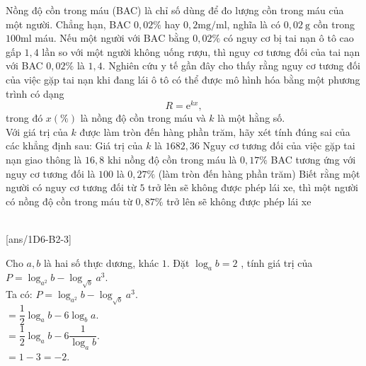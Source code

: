 \begin{ex}%
	Nồng độ cồn trong máu (BAC) là chỉ số dùng để đo lượng cồn trong máu của một người. Chẳng hạn, BAC $0{,}02\%$ hay $0{,}2 \mathrm{mg} / \mathrm{ml}$, nghĩa là có $0{,}02 \mathrm{~g}$ cồn trong $100 \mathrm{ml}$ máu. Nếu một người với $\mathrm{BAC}$ bằng $0{,}02 \%$ có nguy cơ bị tai nạn ô tô cao gấp $1{,}4$ lần so với một người không uống rượu, thì nguy cơ tương đối của tai nạn với BAC $0{,}02 \%$ là $1{,}4$. Nghiên cứu y tế gần đây cho thấy rằng nguy cơ tương đối của việc gặp tai nạn khi đang lái ô tô có thể được mô hình hóa bằng một phương trình có dạng
	$$R=\mathrm{e}^{kx},$$
	trong đó $x(\%)$ là nồng độ cồn trong máu và $k$ là một hằng số.\\
	Với giá trị của $k$ được làm tròn đến hàng phần trăm, hãy xét tính đúng sai của các khẳng định sau:
	\choiceTF
	{\True Giá trị của $k$ là $1682,36$}
	{Nguy cơ tương đối của việc gặp tai nạn giao thông là $16,8$ khi nồng độ cồn trong máu là $0{,}17\%$ }
	{\True BAC tương ứng với  nguy cơ tương đối là $100$ là $0,27\%$ (làm tròn đến hàng phần trăm)}
	{Biết rằng một người có nguy cơ tương đối từ $5$ trở lên sẽ không được phép lái xe, thì một người có nồng độ cồn trong máu từ $0,87\%$ trở lên sẽ không được phép lái xe}
\end{ex}


 \\
[ans/1D6-B2-3]

\begin{ex}
	Cho $a,b$ là hai số thực dương, khác $1$. Đặt ${{\log }_{a}}b=2$ , tính giá trị của $P={{\log }_{{{a}^{2}}}}b-{{\log }_{\sqrt{b}}}{{a}^{3}}.$ \\
	\loigiai
	{
		Ta có:  $P={{\log }_{{{a}^{2}}}}b-{{\log }_{\sqrt{b}}}{{a}^{3}}$. \\
		$=\dfrac{1}{2}{{\log }_{a}}b-6{{\log }_{b}}a$. \\
		$=\dfrac{1}{2}{{\log }_{a}}b-6\dfrac{1}{{{\log }_{a}}b}$. \\
		$=1-3=-2$.
	}
\end{ex}

